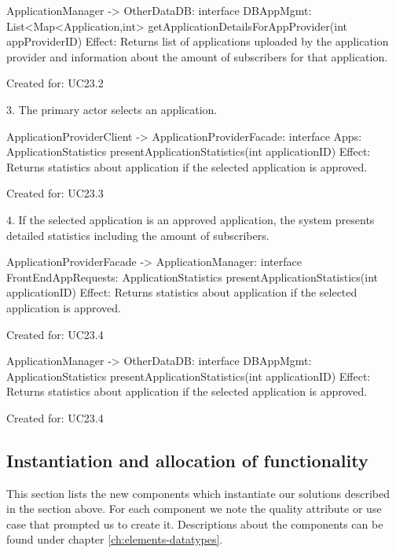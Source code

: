 {{{            ApplicationManager -> OtherDataDB: interface DBAppMgmt:
                                                List<Map<Application,int> getApplicationDetailsForAppProvider(int appProviderID)
                Effect: Returns list of applications uploaded by the application provider and information about the amount of subscribers
                        for that application.
                \item Created for: UC23.2

        3. The primary actor selects an application.

            ApplicationProviderClient -> ApplicationProviderFacade: interface Apps:
                                                    ApplicationStatistics presentApplicationStatistics(int applicationID)
                Effect: Returns statistics about application if the selected application is approved.
                \item Created for: UC23.3

        4. If the selected application is an approved application, the system presents detailed statistics including the amount of
        subscribers.

        ApplicationProviderFacade -> ApplicationManager: interface FrontEndAppRequests:
                                                    ApplicationStatistics presentApplicationStatistics(int applicationID)
                Effect: Returns statistics about application if the selected application is approved.
                \item Created for: UC23.4

        ApplicationManager -> OtherDataDB: interface DBAppMgmt:
                                                    ApplicationStatistics presentApplicationStatistics(int applicationID)
                Effect: Returns statistics about application if the selected application is approved.
                \item Created for: UC23.4




\subsection{Instantiation and allocation of functionality}
    This section lists the new components which instantiate our solutions
    described in the section above. For each component we note the quality
    attribute or use case that prompted us to create it. Descriptions about
    the components can be found under chapter \ref{ch:elements-datatypes}. \\

}}}
